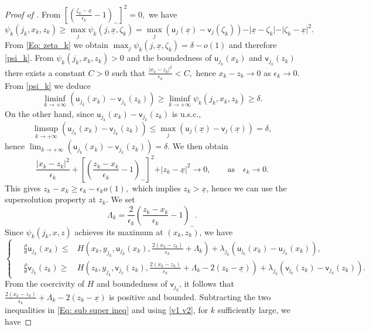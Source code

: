 \documentclass[11pt]{article}
\numberwithin{equation}{section}
\theoremstyle{definition}
\newcommand{\ux}{{\underline x}}
\newcommand{\beq}{\begin{equation}}
\newcommand{\eeq}{\end{equation}}
\newcommand{\e}{\epsilon}
\theoremstyle{plain}
\begin{document}
\begin{appendices}
\begin{proof}[Proof of ]
From
$
\left[\left(\frac{\zeta_k-\ux}{\e_k}-1\right)_{-}\right]^2=0,
$
we have 
$$
\psi_k(j_{k}, x_{k},z_{k})\geq \max_j\psi_k(j,\ux,\zeta_k) =\max_j(\mathsf{u}_j(\ux)-\mathsf{v}_j(\zeta_k))-\vert \ux-\zeta_k\vert-\vert \zeta_k-\ux\vert^2.
$$
From \cref{Eq: zeta_k} we obtain
$
\max_j\psi_k(j,\ux,\zeta_k) =\delta-o(1)
$
and therefore \cref{psi_k}. From $\psi_k(j_{k}, x_{k},z_{k})> 0$ and the boundedness of $\mathsf{u}_{j_{k}}(x_{k})$ and $\mathsf{v}_{j_{k}}(z_{k})$ there exists a constant $C>0$ such that 
$
\frac{\vert x_{k}-z_{k}\vert^2}{\e_k}<C,
$
hence $x_{k}-z_{k}\to 0$ as $\e_k\to 0$. From \cref{psi_k} we deduce 
$$
\liminf_{k\to +\infty}(\mathsf{u}_{j_{k}}(x_{k})-\mathsf{v}_{j_{k}}(z_{k}))\geq \liminf_{k\to +\infty}\psi_k(j_{k},x_{k},z_{k})\geq \delta. 
$$
On the other hand, since $\mathsf{u}_{j_{k}}(x_{k})-\mathsf{v}_{j_{k}}(z_{k})$ is u.s.c., 
$$
\limsup_{k\to +\infty}(\mathsf{u}_{j_{k}}(x_{k})-\mathsf{v}_{j_{k}}(z_{k}))\leq \max_j(\mathsf{u}_j(\ux)-\mathsf{v}_j(\ux))=\delta,
$$
hence
$
\lim_{k\to +\infty}(\mathsf{u}_{j_{k}}(x_{k})-\mathsf{v}_{j_{k}}(z_{k}))=\delta. 
$
We then obtain 
\begin{equation*}
\frac{\vert x_{k}-z_{k}\vert^2}{\e_k}+
\left[\left(\frac{z_{k}-x_{k}}{\e_k}-1\right)_{-}\right]^2+
\vert z_{k}-\ux\vert^2\to 0,\qquad \text{as}\quad \e_k\to 0.
\end{equation*}
This gives 
$
z_{k}-x_{k}\geq \e_k-\e_ko(1),
$
which implies $z_{k}>\ux$, hence we can use the supersolution property at $z_{k}$. We set
$$
\Lambda_k=\frac{2}{\e_k}\left(\frac{z_{k}-x_k}{\e_k}-1\right)_{-}.
$$
Since $\psi_k(j_{k},x,z)$ achieves its maximum at $(x_{k},z_{k})$, we have
\beq\label{Eq: sub super ineq}
	\left\{\begin{aligned}
\quad  \frac{\rho}{\theta} \mathsf{u}_{j_{k}}(x_{k}) \leq &H\left(x_{k},y_{j_{k}},\mathsf{u}_{j_{k}}(x_{k}),\frac{2( x_{k}-z_{k} )}{\e_k}+\Lambda_k \right)+\lambda_{j_{k}}\left(\mathsf{u}_{\bar{\jmath}_{k}}(x_{k}) -\mathsf{u}_{j_{k}}(x_{k}) \right),\\
\quad \frac{\rho}{\theta}  \mathsf{v}_{j_{k}}(z_{k}) \geq & H\left(z_{k},y_{j_{k}},\mathsf{v}_{j_{k}}(z_{k}) ,\frac{2( x_{k}-z_{k} )}{\e_k}+\Lambda_k-2(z_{k}-\ux) \right)+\lambda_{j_{k}}\left(\mathsf{v}_{\bar{\jmath}_{k}}(z_{k}) -\mathsf{v}_{j_{k}}(z_{k}) \right).
	\end{aligned}\right.
\eeq
From the coercivity of $H$ and boundedness of $\mathsf{v}_{j_{k}}$, it follows that $\frac{2( x_{k}-z_{k} )}{\e_k}+\Lambda_k-2(z_{k}-\ux)$ is positive and bounded. Subtracting the two inequalities in \cref{Eq: sub super ineq} and using \cref{v1 v2}, for $k$ sufficiently large, we have 

\end{proof}
\end{appendices}
\end{document}
